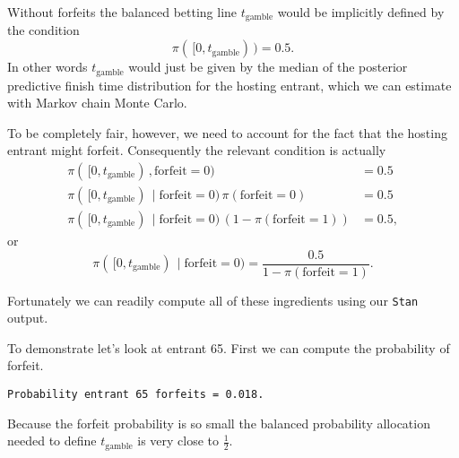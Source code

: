 \documentclass[
  letterpaper,
  DIV=11,
  numbers=noendperiod]{scrartcl}
\newenvironment{Shaded}{\begin{snugshade}}{\end{snugshade}}
\newcommand{\DecValTok}[1]{\textcolor[rgb]{0.68,0.00,0.00}{#1}}
\newcommand{\FunctionTok}[1]{\textcolor[rgb]{0.28,0.35,0.67}{#1}}
\newcommand{\NormalTok}[1]{\textcolor[rgb]{0.00,0.23,0.31}{#1}}
\newcommand{\OtherTok}[1]{\textcolor[rgb]{0.00,0.23,0.31}{#1}}
\newcommand{\SpecialCharTok}[1]{\textcolor[rgb]{0.37,0.37,0.37}{#1}}
\newcommand{\StringTok}[1]{\textcolor[rgb]{0.13,0.47,0.30}{#1}}
\begin{document}
Without forfeits the balanced betting line \(t_{\mathrm{gamble}}\) would
be implicitly defined by the condition \[
\pi( \, [ 0, t_{\mathrm{gamble}} ) \, ) = 0.5.
\] In other words \(t_{\mathrm{gamble}}\) would just be given by the
median of the posterior predictive finish time distribution for the
hosting entrant, which we can estimate with Markov chain Monte Carlo.

To be completely fair, however, we need to account for the fact that the
hosting entrant might forfeit. Consequently the relevant condition is
actually \begin{align*}
\pi( \, [ 0, t_{\mathrm{gamble}} ) \, , \mathrm{forfeit} = 0 )
&=
0.5
\\
\pi( \, [ 0, t_{\mathrm{gamble}} ) \, \mid \mathrm{forfeit} = 0 ) \,
\pi( \mathrm{forfeit} = 0 )
&=
0.5
\\
\pi( \, [ 0, t_{\mathrm{gamble}} ) \, \mid \mathrm{forfeit} = 0 ) \,
\left( 1 - \pi( \mathrm{forfeit} = 1 ) \right)
&=
0.5,
\end{align*} or \[
\pi( \, [ 0, t_{\mathrm{gamble}} ) \, \mid \mathrm{forfeit} = 0 )
=
\frac{0.5}{ 1 - \pi( \mathrm{forfeit} = 1 ) }.
\]

Fortunately we can readily compute all of these ingredients using our
\texttt{Stan} output.

To demonstrate let's look at entrant 65. First we can compute the
probability of forfeit.

\begin{Shaded}
\end{Shaded}

\begin{verbatim}
Probability entrant 65 forfeits = 0.018.
\end{verbatim}

Because the forfeit probability is so small the balanced probability
allocation needed to define \(t_{\mathrm{gamble}}\) is very close to
\(\frac{1}{2}\).
\end{document}
